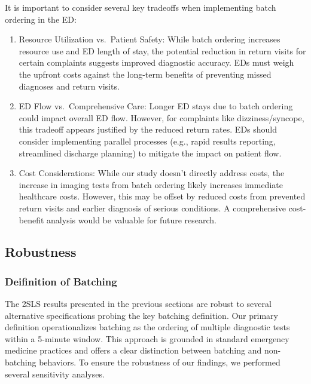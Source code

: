 \documentclass{article}
\begin{document}
It is important to consider several key tradeoffs when implementing
batch ordering in the ED:

\begin{enumerate}
\def\labelenumi{\arabic{enumi}.}
\item
  Resource Utilization vs.~Patient Safety: While batch ordering
  increases resource use and ED length of stay, the potential reduction
  in return visits for certain complaints suggests improved diagnostic
  accuracy. EDs must weigh the upfront costs against the long-term
  benefits of preventing missed diagnoses and return visits.
\item
  ED Flow vs.~Comprehensive Care: Longer ED stays due to batch ordering
  could impact overall ED flow. However, for complaints like
  dizziness/syncope, this tradeoff appears justified by the reduced
  return rates. EDs should consider implementing parallel processes
  (e.g., rapid results reporting, streamlined discharge planning) to
  mitigate the impact on patient flow.
\item
  Cost Considerations: While our study doesn't directly address costs,
  the increase in imaging tests from batch ordering likely increases
  immediate healthcare costs. However, this may be offset by reduced
  costs from prevented return visits and earlier diagnosis of serious
  conditions. A comprehensive cost-benefit analysis would be valuable
  for future research.
\end{enumerate}

\hypertarget{robustness}{%
\subsection{Robustness}\label{robustness}}

\hypertarget{deifinition-of-batching}{%
\subsubsection{Deifinition of Batching}\label{deifinition-of-batching}}

The 2SLS results presented in the previous sections are robust to
several alternative specifications probing the key batching definition.
Our primary definition operationalizes batching as the ordering of
multiple diagnostic tests within a 5-minute window. This approach is
grounded in standard emergency medicine practices and offers a clear
distinction between batching and non-batching behaviors. To ensure the
robustness of our findings, we performed several sensitivity analyses.
\end{document}
